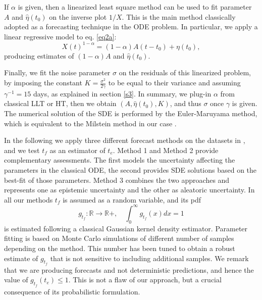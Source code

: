 \documentclass{article}
\begin{document}
If $\alpha$ is given, then a linearized least square method can be used to fit parameter $A$ and $\hat\eta(t_0)$ on the inverse plot $1/X$. This is the main method classically adopted as a forecasting technique in the ODE problem. In particular, we apply a linear regressive model to eq. \ref{eq2a}:
$$X(t)^{1-\alpha}=(1-\alpha)A(t-t_0)+\eta(t_0),$$
producing estimates of $(1-\alpha)A$ and $\hat\eta(t_0)$.

Finally, we fit the noise parameter $\sigma$ on the residuals of this linearized problem, by imposing the constant $K=\frac{\sigma^2}{2\gamma}$ to be equal to their variance and assuming $\gamma^{-1}=15$ days, as explained in section \ref{s3}. In summary, we plug-in $\alpha$ from classical LLT or HT, then we obtain $\left(A,\hat\eta(t_0),K\right)$, and thus $\sigma$ once $\gamma$ is given. The numerical solution of the SDE is performed by the Euler-Maruyama method, which is equivalent to the Milstein method in our case \citep{Kloeden1994}.

In the following we apply three different forecast methods on the datasets in \cite{Voight1988}, and we test $t_f$ as an estimator of $t_e$. Method 1 and Method 2 provide complementary assessments. The first models the uncertainty affecting the parameters in the classical ODE, the second provides SDE solutions based on the best-fit of those parameters. Method 3 combines the two approaches and represents one as epistemic uncertainty and the other as aleatoric uncertainty. In all our methods $t_f$ is assumed as a random variable, and its pdf
$$g_{t_f}:\mathbb R\rightarrow \mathbb R+,\quad \int_0^\infty g_{t_f}(x) dx=1$$
is estimated following a classical Gaussian kernel density estimator. Parameter fitting is based on Monte Carlo simulations of different number of samples depending on the method. This number has been tuned to obtain a robust estimate of $g_{t_f}$ that is not sensitive to including additional samples. We remark that we are producing forecasts and not deterministic predictions, and hence the value of $g_{t_f}(t_e)\le 1$. This is not a flaw of our approach, but a crucial consequence of its probabilistic formulation.
\end{document}
